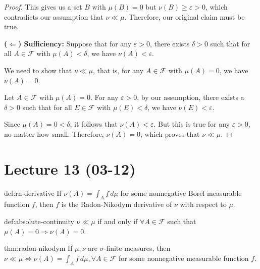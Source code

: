 \begin{proof}
                        This gives us a set $B$ with $\mu(B) = 0$ but $\nu(B) \geq \varepsilon > 0$, which contradicts our assumption that $\nu \ll \mu$. Therefore, our original claim must be true.
                        
                        \textbf{($\Leftarrow$) Sufficiency:} Suppose that for any $\varepsilon > 0$, there exists $\delta > 0$ such that for all $A \in \mathcal{F}$ with $\mu(A) < \delta$, we have $\nu(A) < \varepsilon$.
                        
                        We need to show that $\nu \ll \mu$, that is, for any $A \in \mathcal{F}$ with $\mu(A) = 0$, we have $\nu(A) = 0$.
                        
                        Let $A \in \mathcal{F}$ with $\mu(A) = 0$. For any $\varepsilon > 0$, by our assumption, there exists a $\delta > 0$ such that for all $E \in \mathcal{F}$ with $\mu(E) < \delta$, we have $\nu(E) < \varepsilon$.
                        
                        Since $\mu(A) = 0 < \delta$, it follows that $\nu(A) < \varepsilon$. But this is true for any $\varepsilon > 0$, no matter how small. Therefore, $\nu(A) = 0$, which proves that $\nu \ll \mu$.
                        \end{proof}
\section{Lecture 13 (03-12)}
\begin{definition}{def:rn-derivative}
    If $\nu(A) = \int_A f \, d\mu$ for some nonnegative Borel measurable function $f$, then $f$ is the Radon-Nikodym derivative of $\nu$ with respect to $\mu$.
    \end{definition}
    
    \begin{definition}{def:absolute-continuity}
    $\nu \ll \mu$ if and only if $\forall A \in \mathcal{F}$ such that $\mu(A) = 0 \Rightarrow \nu(A) = 0$.
    \end{definition}
    
    \begin{theorem}{thm:radon-nikodym}
    If $\mu, \nu$ are $\sigma$-finite measures, then $\nu \ll \mu \Leftrightarrow \nu(A) = \int_A f \, d\mu, \forall A \in \mathcal{F}$ for some nonnegative measurable function $f$.
    \end{theorem}
    
